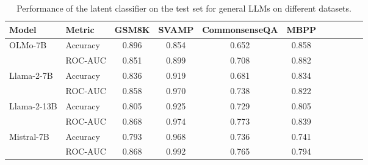 \begin{table}[t]
\centering
\small
\caption{Performance of the latent classifier on the test set for general LLMs on different datasets.}
\begin{tabular}{llccccccccc}
\toprule
                       \textbf{Model}& \textbf{Metric}& 
                       \centering\textbf{GSM8K}&\textbf{SVAMP} & \textbf{CommonsenseQA}  & \textbf{MBPP}
\\ \midrule \multirow{2}{*}{OLMo-7B} &Accuracy  &0.896
&0.854&0.652 &0.858\\ 
&ROC-AUC &0.851&0.899&0.708&0.882                
\\
\midrule \multirow{2}{*}{Llama-2-7B} &Accuracy   &0.836 
&0.919&0.681 &0.834\\ 
&ROC-AUC &0.858&0.970&0.738&0.822             \\

\midrule \multirow{2}{*}{Llama-2-13B}
&Accuracy  &0.805
&0.925&0.729 &0.805\\ 
&ROC-AUC &0.868&0.974&0.773&0.839                
\\
\midrule
\multirow{2}{*}{Mistral-7B} &Accuracy   &0.793  
&0.968&0.736 &0.741\\ 
&ROC-AUC &0.868&0.992&0.765&0.794               
\\
\bottomrule
\end{tabular}
\label{tab:classification_performance_general_llms}
\end{table}

